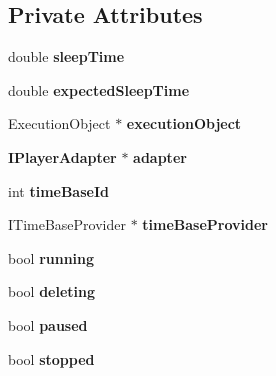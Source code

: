 \subsection*{Private Attributes}
\begin{CompactItemize}
\item 
double {\bf sleepTime}\label{classbr_1_1pucrio_1_1telemidia_1_1ginga_1_1ncl_1_1adapters_1_1NominalEventMonitor_f44c0d8ffa88a1ce0b2e46571b0c5814}

\item 
double {\bf expectedSleepTime}\label{classbr_1_1pucrio_1_1telemidia_1_1ginga_1_1ncl_1_1adapters_1_1NominalEventMonitor_86817c7c99038d6075554b5127564262}

\item 
ExecutionObject $\ast$ {\bf executionObject}\label{classbr_1_1pucrio_1_1telemidia_1_1ginga_1_1ncl_1_1adapters_1_1NominalEventMonitor_f83de7ef273ad63179e90a1327416093}

\item 
{\bf IPlayerAdapter} $\ast$ {\bf adapter}\label{classbr_1_1pucrio_1_1telemidia_1_1ginga_1_1ncl_1_1adapters_1_1NominalEventMonitor_6c0df6adced6b4821fe70531a2de7400}

\item 
int {\bf timeBaseId}\label{classbr_1_1pucrio_1_1telemidia_1_1ginga_1_1ncl_1_1adapters_1_1NominalEventMonitor_c7f2ade94598885a8860f22e07af1f3b}

\item 
ITimeBaseProvider $\ast$ {\bf timeBaseProvider}\label{classbr_1_1pucrio_1_1telemidia_1_1ginga_1_1ncl_1_1adapters_1_1NominalEventMonitor_a768d0b9325a7db85149852491c20fe1}

\item 
bool {\bf running}\label{classbr_1_1pucrio_1_1telemidia_1_1ginga_1_1ncl_1_1adapters_1_1NominalEventMonitor_36f7b6be7108281af77939ceaec42fd6}

\item 
bool {\bf deleting}\label{classbr_1_1pucrio_1_1telemidia_1_1ginga_1_1ncl_1_1adapters_1_1NominalEventMonitor_73dcd7977c4db81e50a24cbc794320c5}

\item 
bool {\bf paused}\label{classbr_1_1pucrio_1_1telemidia_1_1ginga_1_1ncl_1_1adapters_1_1NominalEventMonitor_1656129c4a4fd8809254194f08f0ac70}

\item 
bool {\bf stopped}\label{classbr_1_1pucrio_1_1telemidia_1_1ginga_1_1ncl_1_1adapters_1_1NominalEventMonitor_4bbd5ff52abed3e07aa5205f1179d9d3}

\end{CompactItemize}
